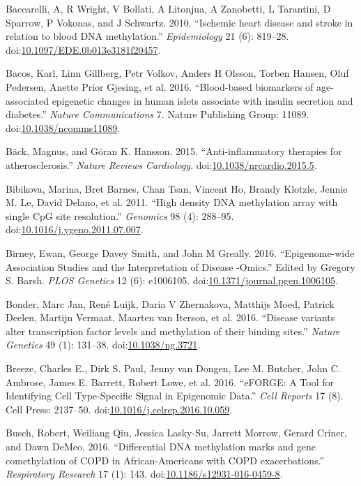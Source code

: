 \documentclass[]{article}
\theoremstyle{definition}
\theoremstyle{definition}
\theoremstyle{definition}
\theoremstyle{remark}
\begin{document}
Baccarelli, A, R Wright, V Bollati, A Litonjua, A Zanobetti, L
Tarantini, D Sparrow, P Vokonas, and J Schwartz. 2010. ``Ischemic heart
disease and stroke in relation to blood DNA methylation.''
\emph{Epidemiology} 21 (6): 819--28.
doi:\href{http://dx.doi.org/10.1097/EDE.0b013e3181f20457}{10.1097/EDE.0b013e3181f20457}.

Bacos, Karl, Linn Gillberg, Petr Volkov, Anders H Olsson, Torben Hansen,
Oluf Pedersen, Anette Prior Gjesing, et al. 2016. ``Blood-based
biomarkers of age-associated epigenetic changes in human islets
associate with insulin secretion and diabetes.'' \emph{Nature
Communications} 7. Nature Publishing Group: 11089.
doi:\href{http://dx.doi.org/10.1038/ncomms11089}{10.1038/ncomms11089}.

B{ä}ck, Magnus, and G{ö}ran K. Hansson. 2015. ``Anti-inflammatory
therapies for atherosclerosis.'' \emph{Nature Reviews Cardiology}.
doi:\href{http://dx.doi.org/10.1038/nrcardio.2015.5}{10.1038/nrcardio.2015.5}.

Bibikova, Marina, Bret Barnes, Chan Tsan, Vincent Ho, Brandy Klotzle,
Jennie M. Le, David Delano, et al. 2011. ``High density DNA methylation
array with single CpG site resolution.'' \emph{Genomics} 98 (4):
288--95.
doi:\href{http://dx.doi.org/10.1016/j.ygeno.2011.07.007}{10.1016/j.ygeno.2011.07.007}.

Birney, Ewan, George Davey Smith, and John M Greally. 2016.
``Epigenome-wide Association Studies and the Interpretation of Disease
-Omics.'' Edited by Gregory S. Barsh. \emph{PLOS Genetics} 12 (6):
e1006105.
doi:\href{http://dx.doi.org/10.1371/journal.pgen.1006105}{10.1371/journal.pgen.1006105}.

Bonder, Marc Jan, Ren{é} Luijk, Daria V Zhernakova, Matthijs Moed,
Patrick Deelen, Martijn Vermaat, Maarten van Iterson, et al. 2016.
``Disease variants alter transcription factor levels and methylation of
their binding sites.'' \emph{Nature Genetics} 49 (1): 131--38.
doi:\href{http://dx.doi.org/10.1038/ng.3721}{10.1038/ng.3721}.

Breeze, Charles E., Dirk S. Paul, Jenny van Dongen, Lee M. Butcher, John
C. Ambrose, James E. Barrett, Robert Lowe, et al. 2016. ``eFORGE: A Tool
for Identifying Cell Type-Specific Signal in Epigenomic Data.''
\emph{Cell Reports} 17 (8). Cell Press: 2137--50.
doi:\href{http://dx.doi.org/10.1016/j.celrep.2016.10.059}{10.1016/j.celrep.2016.10.059}.

Busch, Robert, Weiliang Qiu, Jessica Lasky-Su, Jarrett Morrow, Gerard
Criner, and Dawn DeMeo. 2016. ``Differential DNA methylation marks and
gene comethylation of COPD in African-Americans with COPD
exacerbations.'' \emph{Respiratory Research} 17 (1): 143.
doi:\href{http://dx.doi.org/10.1186/s12931-016-0459-8}{10.1186/s12931-016-0459-8}.
\end{document}
